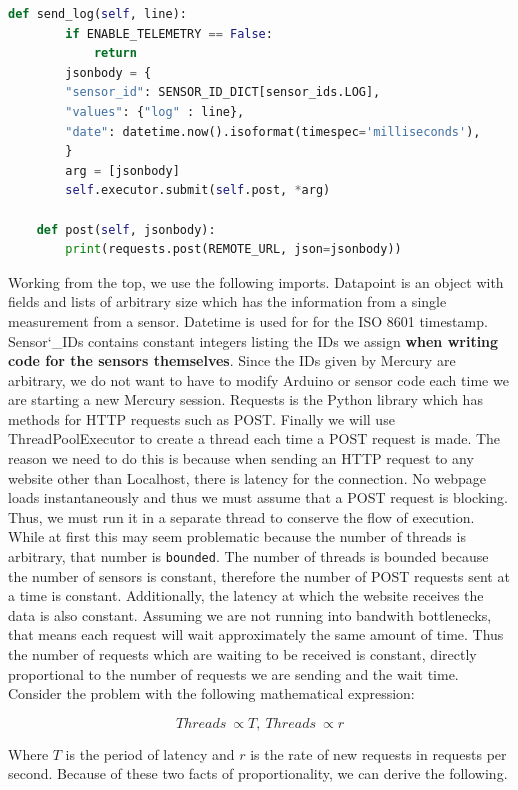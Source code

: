 \documentclass[12pt, letterpaper]{article}
\begin{document}
{{{{{{{{{{{{\begin{lstlisting}[language=Python, caption=\texttt{mercury\char`_telemetry\char`_pipeline.py}]
    def send_log(self, line):
        if ENABLE_TELEMETRY == False:
            return
        jsonbody = {
        "sensor_id": SENSOR_ID_DICT[sensor_ids.LOG],
        "values": {"log" : line},
        "date": datetime.now().isoformat(timespec='milliseconds'),
        }
        arg = [jsonbody]
        self.executor.submit(self.post, *arg)

    def post(self, jsonbody):
        print(requests.post(REMOTE_URL, json=jsonbody))
\end{lstlisting}

\par Working from the top, we use the following imports. Datapoint is an object with fields and lists of arbitrary size which has the information from a single measurement from a sensor. Datetime is used for for the ISO 8601 timestamp. Sensor\char`_IDs contains constant integers listing the IDs we assign \textbf{when writing code for the sensors themselves}. Since the IDs given by Mercury are arbitrary, we do not want to have to modify Arduino or sensor code each time we are starting a new Mercury session. Requests is the Python library which has methods for HTTP requests such as POST. Finally we will use ThreadPoolExecutor to create a thread each time a POST request is made. The reason we need to do this is because when sending an HTTP request to any website other than Localhost, there is latency for the connection. No webpage loads instantaneously and thus we must assume that a POST request is blocking. Thus, we must run it in a separate thread to conserve the flow of execution. While at first this may seem problematic because the number of threads is arbitrary, that number is \texttt{bounded}. The number of threads is bounded because the number of sensors is constant, therefore the number of POST requests sent at a time is constant. Additionally, the latency at which the website receives the data is also constant. Assuming we are not running into bandwith bottlenecks, that means each request will wait approximately the same amount of time. Thus the number of requests which are waiting to be received is constant, directly proportional to the number of requests we are sending and the wait time. Consider the problem with the following mathematical expression:

\begin{equation}
	Threads\ \propto T,\ Threads\ \propto r
\end{equation}

\par Where $T$ is the period of latency and $r$ is the rate of new requests in requests per second. Because of these two facts of proportionality, we can derive the following. 

}}}}}}}}}}}}
\end{document}
